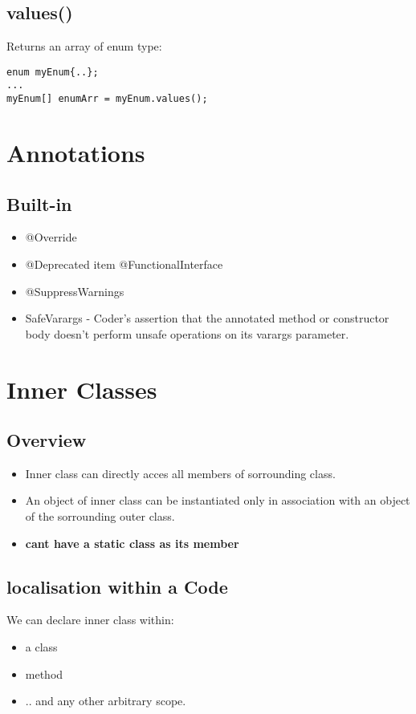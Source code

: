 \documentclass{report}
\begin{document}
\section{values()}
Returns an array of enum type:
\begin{verbatim}
enum myEnum{..};
...
myEnum[] enumArr = myEnum.values();
\end{verbatim}

\chapter{Annotations}
\section{Built-in}
\begin{itemize}
	\item @Override
	\item @Deprecated
	item @FunctionalInterface
	\item @SuppressWarnings
	\item SafeVarargs - Coder’s assertion that the annotated method or constructor body doesn’t perform unsafe operations on its varargs parameter.
\end{itemize}

\chapter{Inner Classes}
\section{Overview}
\begin{itemize}
	\item Inner class can directly acces all members of sorrounding class. 
	\item An object of inner class can  be instantiated only in association with an object
	of the sorrounding outer class.
	\item \textbf{cant have a static class as its member}
\end{itemize}

\section{localisation within a Code}
We can declare inner class within:
\begin{itemize}
	\item a class
	\item method
	\item .. and any other arbitrary scope.
\end{itemize}
\end{document}
